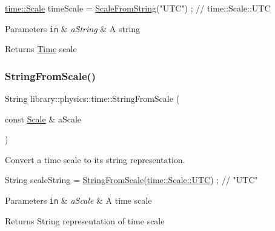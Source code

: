 \begin{DoxyCode}
\hyperlink{namespacelibrary_1_1physics_1_1time_a09d2bc9fbc7b0b5f92e1419bd655e6bb}{time::Scale} timeScale = \hyperlink{namespacelibrary_1_1physics_1_1time_a99243c1ba273cb0ad1d7581aea8ff42a}{ScaleFromString}(\textcolor{stringliteral}{"UTC"}) ; \textcolor{comment}{// time::Scale::UTC}
\end{DoxyCode}



\begin{DoxyParams}[1]{Parameters}
\mbox{\tt in}  & {\em a\+String} & A string \\
\hline
\end{DoxyParams}
\begin{DoxyReturn}{Returns}
\hyperlink{classlibrary_1_1physics_1_1time_1_1_time}{Time} scale 
\end{DoxyReturn}
\mbox{\label{namespacelibrary_1_1physics_1_1time_a9e12dac6f85c8e5d30419ec136d97b16}} 
\subsubsection{\texorpdfstring{String\+From\+Scale()}{StringFromScale()}}
{\footnotesize\ttfamily String library\+::physics\+::time\+::\+String\+From\+Scale (\begin{DoxyParamCaption}\item[{const \hyperlink{namespacelibrary_1_1physics_1_1time_a09d2bc9fbc7b0b5f92e1419bd655e6bb}{Scale} \&}]{a\+Scale }\end{DoxyParamCaption})}



Convert a time scale to its string representation. 


\begin{DoxyCode}
String scaleString = \hyperlink{namespacelibrary_1_1physics_1_1time_a9e12dac6f85c8e5d30419ec136d97b16}{StringFromScale}(\hyperlink{namespacelibrary_1_1physics_1_1time_a09d2bc9fbc7b0b5f92e1419bd655e6bba9234324ddf6b4176b57d803a925b7961}{time::Scale::UTC}) ; \textcolor{comment}{// "UTC"}
\end{DoxyCode}



\begin{DoxyParams}[1]{Parameters}
\mbox{\tt in}  & {\em a\+Scale} & A time scale \\
\hline
\end{DoxyParams}
\begin{DoxyReturn}{Returns}
String representation of time scale 
\end{DoxyReturn}
